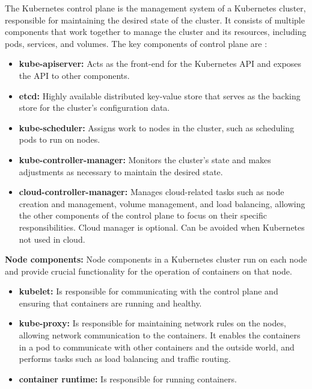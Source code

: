 The Kubernetes control plane is the management system of a Kubernetes cluster, responsible for maintaining the desired state of the cluster. It consists of multiple components that work together to manage the cluster and its resources, including pods, services, and volumes. The key components of control plane are \cite{masteringKubernetesConcepts}:
\begin{itemize}
  \item \textbf{kube-apiserver:} Acts as the front-end for the Kubernetes API and exposes the API to other components. \cite{docuKubeComponents}
  \item \textbf{etcd:} Highly available distributed key-value store that serves as the backing store for the cluster's configuration data. \cite{Dobies2020}
  \item \textbf{kube-scheduler:} Assigns work to nodes in the cluster, such as scheduling pods to run on nodes. \cite{kubeUpAndRunningPods}
  \item \textbf{kube-controller-manager:} Monitors the cluster's state and makes adjustments as necessary to maintain the desired state. \cite{masteringKubernetesConcepts}
  \item \textbf{cloud-controller-manager:} Manages cloud-related tasks such as node creation and management, volume management, and load balancing, allowing the other components of the control plane to focus on their specific responsibilities. Cloud manager is optional. Can be avoided when Kubernetes not used in cloud. \cite{docuKubeComponents}
\end{itemize}
\textbf{Node components:}
Node components in a Kubernetes cluster run on each node and provide crucial functionality for the operation of containers on that node. \cite{docuKubeComponents}
\begin{itemize}
  \item \textbf{kubelet:} Is responsible for communicating with the control plane and ensuring that containers are running and healthy. \cite{kubeUpAndRunning}
  \item \textbf{kube-proxy:} Is responsible for maintaining network rules on the nodes, allowing network communication to the containers. It enables the containers in a pod to communicate with other containers and the outside world, and performs tasks such as load balancing and traffic routing. \cite{kubeUpAndRunning}
  \item \textbf{container runtime:} Is responsible for running containers. \cite{docuKubeComponents}
\end{itemize}

